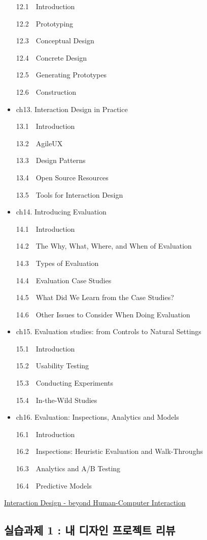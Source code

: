 \documentclass[
  letterpaper,
  DIV=11,
  numbers=noendperiod]{scrreprt}
\begin{document}
\begin{itemize}
  12.1 Introduction

  12.2 Prototyping

  12.3 Conceptual Design

  12.4 Concrete Design

  12.5 Generating Prototypes

  12.6 Construction
\item
  ch13. Interaction Design in Practice

  13.1 Introduction

  13.2 AgileUX

  13.3 Design Patterns

  13.4 Open Source Resources

  13.5 Tools for Interaction Design
\item
  ch14. Introducing Evaluation

  14.1 Introduction

  14.2 The Why, What, Where, and When of Evaluation

  14.3 Types of Evaluation

  14.4 Evaluation Case Studies

  14.5 What Did We Learn from the Case Studies?

  14.6 Other Issues to Consider When Doing Evaluation
\item
  ch15. Evaluation studies: from Controls to Natural Settings

  15.1 Introduction

  15.2 Usability Testing

  15.3 Conducting Experiments

  15.4 In-the-Wild Studies
\item
  ch16. Evaluation: Inspections, Analytics and Models

  16.1 Introduction

  16.2 Inspections: Heuristic Evaluation and Walk-Throughs

  16.3 Analytics and A/B Testing

  16.4 Predictive Models
\end{itemize}

\href{http://id-book.com}{Interaction Design - beyond Human-Computer
Interaction}

\subsection{실습과제 1 : 내 디자인 프로젝트
리뷰}\label{uxc2e4uxc2b5uxacfcuxc81c-1-uxb0b4-uxb514uxc790uxc778-uxd504uxb85cuxc81duxd2b8-uxb9acuxbdf0}
\end{document}
